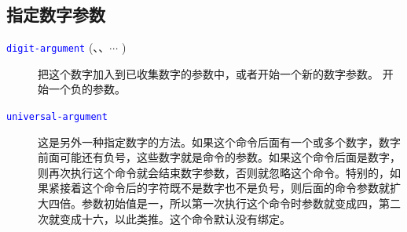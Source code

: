\documentclass[openany,notitlepage]{book}
\newcommand{\code}[1]{\textcolor{blue}{{\tt #1}}}
\begin{document}
\begin{CJK}{UTF8}{song}
\subsection{指定数字参数} %
\begin{description}
    \item[\code{digit-argument} (、、$\cdots$ )] 把这个数字加入到已收集数字的参数中，或者开始一个新的数字参数。 开始一个负的参数。
    \item[\code{universal-argument}] 这是另外一种指定数字的方法。如果这个命令后面有一个或多个数字，数字前面可能还有负号，这些数字就是命令的参数。如果这个命令后面是数字，则再次执行这个命令就会结束数字参数，否则就忽略这个命令。特别的，如果紧接着这个命令后的字符既不是数字也不是负号，则后面的命令参数就扩大四倍。参数初始值是一，所以第一次执行这个命令时参数就变成四，第二次就变成十六，以此类推。这个命令默认没有绑定。
\end{description}


\end{CJK}
\end{document}
